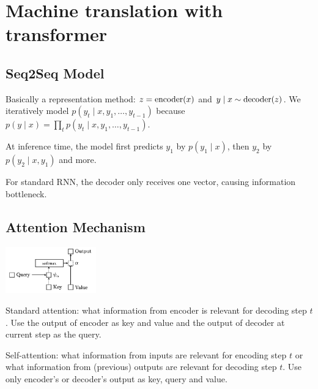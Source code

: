 \section{Machine translation with transformer}

\subsection*{Seq2Seq Model}

Basically a representation method: $z=\text{encoder}(x)$ and $y\mid x \sim \text{decoder}(z)$.
We iteratively model $p(y_t\mid x, y_1, \dots, y_{t-1})$ because $p(y\mid x)=\prod_{t} p(y_t\mid x, y_1, \dots, y_{t-1})$.

At inference time, the model first predicts $y_1$ by $p(y_1\mid x)$, then $y_2$ by $p(y_2\mid x, y_1)$ and more.

For standard RNN, the decoder only receives one vector, causing information bottleneck.

\subsection*{Attention Mechanism}
\begin{center}
    \includegraphics[height=2cm]{img/attention.png}
\end{center}

Standard attention: what information from encoder is relevant for decoding step $t$. Use the output of encoder as key and value and the output of decoder at current step as the query.

Self-attention: what information from inputs are relevant for encoding step $t$ or what
information from (previous) outputs are relevant for decoding step $t$. Use only encoder's or decoder's output as key, query and value.